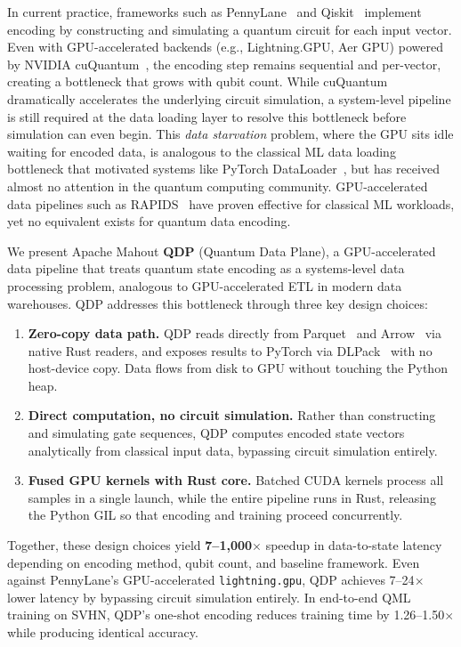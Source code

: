 \documentclass[sigconf, nonacm]{acmart}
\begin{document}
In current practice, frameworks such as PennyLane~\cite{pennylane} and Qiskit~\cite{qiskit} implement encoding by constructing and simulating a quantum circuit for each input vector.
Even with GPU-accelerated backends (e.g., Lightning.GPU, Aer GPU) powered by NVIDIA cuQuantum~\cite{cuquantum2023}, the encoding step remains sequential and per-vector, creating a bottleneck that grows with qubit count.
While cuQuantum dramatically accelerates the underlying circuit simulation, a system-level pipeline is still required at the data loading layer to resolve this bottleneck before simulation can even begin.
This \emph{data starvation} problem, where the GPU sits idle waiting for encoded data, is analogous to the classical ML data loading bottleneck that motivated systems like PyTorch DataLoader~\cite{pytorch}, but has received almost no attention in the quantum computing community.
GPU-accelerated data pipelines such as RAPIDS~\cite{rapids2024} have proven effective for classical ML workloads, yet no equivalent exists for quantum data encoding.

We present Apache Mahout \textbf{QDP} (Quantum Data Plane), a GPU-accelerated data pipeline that treats quantum state encoding as a systems-level data processing problem, analogous to GPU-accelerated ETL in modern data warehouses.
QDP addresses this bottleneck through three key design choices:
\begin{enumerate}
\item \textbf{Zero-copy data path.} QDP reads directly from Parquet~\cite{parquet} and Arrow~\cite{arrow} via native Rust readers, and exposes results to PyTorch via DLPack~\cite{dlpack} with no host-device copy. Data flows from disk to GPU without touching the Python heap.
\item \textbf{Direct computation, no circuit simulation.} Rather than constructing and simulating gate sequences, QDP computes encoded state vectors analytically from classical input data, bypassing circuit simulation entirely.
\item \textbf{Fused GPU kernels with Rust core.} Batched CUDA kernels process all samples in a single launch, while the entire pipeline runs in Rust, releasing the Python GIL so that encoding and training proceed concurrently.
\end{enumerate}

Together, these design choices yield \textbf{7--1{,}000$\times$} speedup in data-to-state latency depending on encoding method, qubit count, and baseline framework.
Even against PennyLane's GPU-accelerated \texttt{lightning.gpu}, QDP achieves 7--24$\times$ lower latency by bypassing circuit simulation entirely.
In end-to-end QML training on SVHN, QDP's one-shot encoding reduces training time by 1.26--1.50$\times$ while producing identical accuracy.
\end{document}
